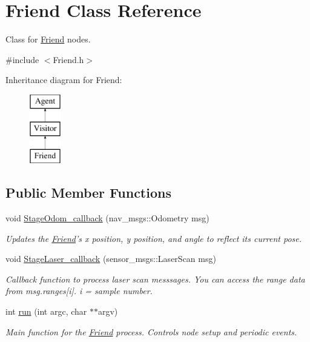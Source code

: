 \hypertarget{classFriend}{\section{Friend Class Reference}
\label{classFriend}
}


Class for \hyperlink{classFriend}{Friend} nodes.  




{\ttfamily \#include $<$Friend.\-h$>$}

Inheritance diagram for Friend\-:\begin{figure}[H]
\begin{center}
\leavevmode
\includegraphics[height=3.000000cm]{classFriend}
\end{center}
\end{figure}
\subsection*{Public Member Functions}
\begin{DoxyCompactItemize}
\item 
void \hyperlink{classFriend_ab336b2a40bc6b9787bd0e9283f29f468}{Stage\-Odom\-\_\-callback} (nav\-\_\-msgs\-::\-Odometry msg)
\begin{DoxyCompactList}\small\item\em Updates the \hyperlink{classFriend}{Friend}'s x position, y position, and angle to reflect its current pose. \end{DoxyCompactList}\item 
void \hyperlink{classFriend_a1334996a432a7d435d40169bad684dc4}{Stage\-Laser\-\_\-callback} (sensor\-\_\-msgs\-::\-Laser\-Scan msg)
\begin{DoxyCompactList}\small\item\em Callback function to process laser scan messsages. You can access the range data from msg.\-ranges\mbox{[}i\mbox{]}. i = sample number. \end{DoxyCompactList}\item 
\hypertarget{classFriend_a110ea1d189a41d95fe2991e4e02f9c34}{int \hyperlink{classFriend_a110ea1d189a41d95fe2991e4e02f9c34}{run} (int argc, char $\ast$$\ast$argv)}\label{classFriend_a110ea1d189a41d95fe2991e4e02f9c34}

\begin{DoxyCompactList}\small\item\em Main function for the \hyperlink{classFriend}{Friend} process. Controls node setup and periodic events. \end{DoxyCompactList}\end{DoxyCompactItemize}
